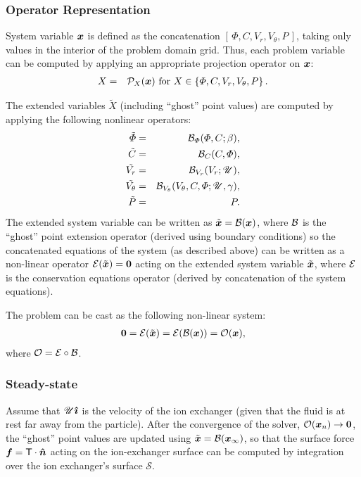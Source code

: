 \subsubsection{Operator Representation}
System variable $\boldsymbol{x}$ is defined as the concatenation $[\,\varPhi, C, V_r, V_\theta, P\,]$,
taking only values in the interior of the problem domain grid.
Thus, each problem variable can be computed by applying an appropriate projection operator on $\boldsymbol{x}$:
\begin{eqnarray}
X &=& \mathcal{P}_X(\boldsymbol{x}) \mbox{ for } X \in \left\{\varPhi, C, V_r, V_\theta, P\right\}.
\end{eqnarray}

The extended variables $\tilde X$ (including ``ghost'' point values) 
are computed by applying the following nonlinear operators:
\begin{eqnarray}
\tilde{\varPhi} &=& \mathcal{B}_\varPhi(\varPhi, C; \beta), \\
\tilde{C} &=& \mathcal{B}_C(C, \varPhi), \\
\tilde{V_r} &=& \mathcal{B}_{V_r}(V_r; \mathscr{U}), \\
\tilde{V_\theta} &=& \mathcal{B}_{V_\theta}(V_\theta, C, \varPhi; \mathscr{U}, \gamma), \\
\tilde{P} &=& P.
\end{eqnarray}
The extended system variable can be written as $\tilde{\boldsymbol{x}} = \mathcal{B}(\boldsymbol{x})$, 
where $\mathcal{B}$ is the ``ghost'' point extension operator (derived using boundary conditions)
so the concatenated equations of the system (as described above) can be written 
as a non-linear operator $\mathcal{E}(\tilde{\boldsymbol{x}}) = \boldsymbol{0}$ acting on the extended system variable 
$\tilde{\boldsymbol{x}}$, where $\mathcal{E}$ is the conservation equations operator 
(derived by concatenation of the system equations).

The problem can be cast as the following non-linear system:
\begin{eqnarray}
\boldsymbol{0} = \mathcal{E} (\tilde{\boldsymbol{x}}) = \mathcal{E} (\mathcal{B} (\boldsymbol{x})) = \mathcal{O}(\boldsymbol{x}),
\end{eqnarray}
 where $\mathcal{O} = \mathcal{E} \circ \mathcal{B}$.

\subsubsection{Steady-state}
Assume that $\mathscr{U} \boldsymbol{\hat{\imath}}$ is the velocity of the ion exchanger 
(given that the fluid is at rest far away from the particle).
After the convergence of the solver, $\mathcal{O}(\boldsymbol{x}_n) \rightarrow \boldsymbol{0}$, 
the ``ghost'' point values are updated using $\tilde{\boldsymbol{x}} = \mathcal{B}(\boldsymbol{x}_\infty)$,
so  that the surface force $\boldsymbol{f} = \mathsf{T} \cdot \boldsymbol{\hat{n}}$ acting 
on the ion-exchanger surface
can be computed by integration over the ion exchanger's surface $\mathcal S$.


